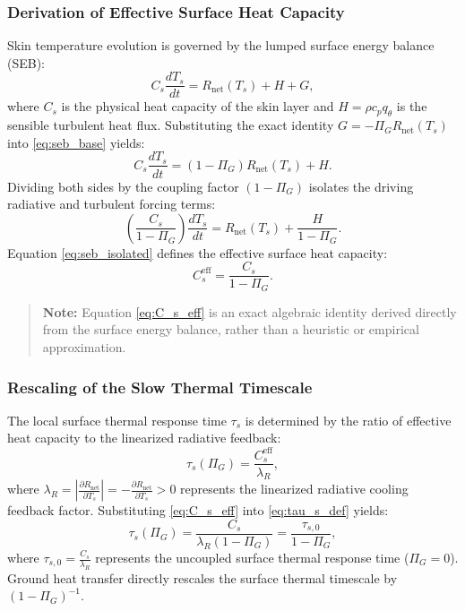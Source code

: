 \documentclass[11pt]{article}
\begin{document}
\subsubsection{Derivation of Effective Surface Heat Capacity}
Skin temperature evolution is governed by the lumped surface energy balance (SEB):
\begin{equation}
C_s \frac{dT_s}{dt} = R_{\text{net}}(T_s) + H + G,
\label{eq:seb_base}
\end{equation}
where $C_s$ is the physical heat capacity of the skin layer and $H = \rho c_p q_\theta$ is the sensible turbulent heat flux. Substituting the exact identity $G = -\Pi_G R_{\text{net}}(T_s)$ into \eqref{eq:seb_base} yields:
\begin{equation}
C_s \frac{dT_s}{dt} = (1 - \Pi_G) R_{\text{net}}(T_s) + H.
\label{eq:seb_substituted}
\end{equation}
Dividing both sides by the coupling factor $(1 - \Pi_G)$ isolates the driving radiative and turbulent forcing terms:
\begin{equation}
\left( \frac{C_s}{1 - \Pi_G} \right) \frac{dT_s}{dt} = R_{\text{net}}(T_s) + \frac{H}{1 - \Pi_G}.
\label{eq:seb_isolated}
\end{equation}
Equation \eqref{eq:seb_isolated} defines the effective surface heat capacity:
\begin{equation}
C_s^{\text{eff}} = \frac{C_s}{1 - \Pi_G}.
\label{eq:C_s_eff}
\end{equation}

\begin{quote}
\textbf{Note:} Equation \eqref{eq:C_s_eff} is an exact algebraic identity derived directly from the surface energy balance, rather than a heuristic or empirical approximation.
\end{quote}

\subsubsection{Rescaling of the Slow Thermal Timescale}
The local surface thermal response time $\tau_s$ is determined by the ratio of effective heat capacity to the linearized radiative feedback:
\begin{equation}
\tau_s(\Pi_G) = \frac{C_s^{\text{eff}}}{\lambda_R},
\label{eq:tau_s_def}
\end{equation}
where $\lambda_R = \left| \frac{\partial R_{\text{net}}}{\partial T_s} \right| = -\frac{\partial R_{\text{net}}}{\partial T_s} > 0$ represents the linearized radiative cooling feedback factor. Substituting \eqref{eq:C_s_eff} into \eqref{eq:tau_s_def} yields:
\begin{equation}
\tau_s(\Pi_G) = \frac{C_s}{\lambda_R (1 - \Pi_G)} = \frac{\tau_{s,0}}{1 - \Pi_G},
\label{eq:tau_s_rescaled}
\end{equation}
where $\tau_{s,0} = \frac{C_s}{\lambda_R}$ represents the uncoupled surface thermal response time ($\Pi_G = 0$). Ground heat transfer directly rescales the surface thermal timescale by $(1 - \Pi_G)^{-1}$.
\end{document}
